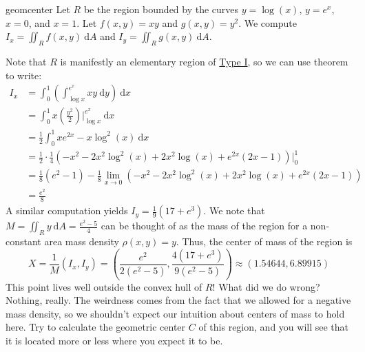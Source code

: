\begin{aexample}{}{geomcenter}
    Let $R$ be the region bounded by the curves $y= \log (x)$, $y=e^x$, $x=0$, and $x=1$. Let $f(x,y) = x y$ and $g(x,y) = y^2$. We compute $I_x = \iint_R f(x,y) \ \mathrm{d} A$ and $I_y = \iint_R g(x,y) \ \mathrm{d} A$.

    Note that $R$ is manifestly an elementary region of \hyperref[eq:elregtype1]{Type I}, so we can use  theorem to write:
    \begin{equation*}
        \begin{aligned}
            I_x &= \int_{0}^{1} \left( \int_{\log x}^{e^x} x y \ \mathrm{d} y\right) \ \mathrm{d} x \\
            &= \int_{0}^{1} x \left( \frac{y^2}{2}\right) \biggr \rvert_{ \log x}^{e^x} \ \mathrm{d} x \\
            &= \frac{1}{2}\int_{0}^{1} x e^{2 x} - x \log^2(x) \ \mathrm{d} x \\
            &= \frac{1}{2} \cdot \frac{1}{4} \left(-x^2-2 x^2 \log ^2(x)+2 x^2 \log (x)+e^{2 x} (2 x-1)\right) \biggr \rvert_{0}^{1} \\
            &= \frac{1}{8} \left( e^2-1\right) - \frac{1}{8}\lim_{x\rightarrow 0} \left(-x^2-2 x^2 \log ^2(x)+2 x^2 \log (x)+e^{2 x} (2 x-1)\right)\\
            &=\frac{e^2}{8}
        \end{aligned}
    \end{equation*}
    A similar computation yields $I_y = \frac{1}{9} \left(17+e^3\right)$. We note that $M = \iint_R y \ \mathrm{d} A = \frac{e^2-5}{4}$ can be thought of as the mass of the region for a non-constant area mass density $\rho(x,y) = y$. Thus, the center of mass of the region is
    \begin{equation*}
        X=\frac{1}{M}(I_x, I_y) = \left(\frac{e^2}{2 \left(e^2-5\right)},\frac{4 \left(17+e^3\right)}{9 \left(e^2-5\right)}\right) \approx (1.54644, 6.89915)
    \end{equation*}
    This point lives well outside the convex hull of $R$! What did we do wrong? Nothing, really. The weirdness comes from the fact that we allowed for a negative mass density, so we shouldn't expect our intuition about centers of mass to hold here. Try to calculate the geometric center $C$ of this region, and you will see that it is located more or less where you expect it to be.


\end{aexample}
